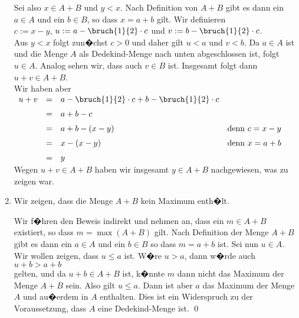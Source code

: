 \begin{enumerate}
      Sei also $x \in A + B$ und $y < x$.  Nach Definition von $A + B$ gibt es dann ein $a \in A$ und ein
      $b \in B$, so dass $x = a + b$ gilt.  Wir definieren
      \\[0.2cm]
      \hspace*{1.3cm} 
      $c := x - y$, \quad $u := a - \bruch{1}{2} \cdot c$ \quad und \quad
      $v := b - \bruch{1}{2} \cdot c$.
      \\[0.2cm]
      Aus $y < x $ folgt zun�chst $c > 0$ und daher gilt $u < a$ und $v < b$.  Da $a \in A$ ist und die
      Menge $A$ als Dedekind-Menge nach unten abgeschlossen ist, folgt $u \in A$.  Analog sehen wir, dass
      auch $v \in B$ ist.  Insgesamt folgt dann
      \\[0.2cm]
      \hspace*{1.3cm}
      $u + v \in A + B$.
      \\[0.2cm]
      Wir haben aber
      \\[0.2cm]
      \hspace*{1.3cm}
      $
      \begin{array}[t]{lcll}
        u + v & = & a - \bruch{1}{2} \cdot c + b - \bruch{1}{2} \cdot c \\[0.2cm]
              & = & a + b - c                                           \\[0.2cm]
              & = & a + b - (x - y)                                     
                  & \mbox{denn $c = x - y$}                             \\[0.2cm]
              & = & x - (x - y)                                     
                  & \mbox{denn $x = a + b$}                             \\[0.2cm]
              & = & y
      \end{array}
      $
      \\[0.2cm]
      Wegen $u + v \in A + B$ haben wir insgesamt $y \in A + B$ nachgewiesen, was zu zeigen war.
\item Wir zeigen, dass die Menge $A + B$ kein Maximum enth�lt.

      Wir f�hren den Beweis indirekt und nehmen an, dass ein $m \in A + B$ existiert, so dass
      $m = \max(A + B)$ gilt.  Nach Definition der Menge $A + B$ gibt es dann ein $a \in A$ und ein 
      $b \in B$ so dass $m = a + b$ ist.  Sei nun $u \in A$.  Wir wollen zeigen, dass $u \leq a$
      ist. W�re $u > a$, dann w�rde auch 
      \\[0.2cm]
      \hspace*{1.3cm}
      $u + b > a + b$
      \\[0.2cm]
      gelten, und da $u + b \in A + B$ ist, k�nnte $m$ dann nicht das Maximum der Menge $A + B$ sein.
      Also gilt $u \leq a$.  Dann ist aber $a$ das Maximum der Menge $A$ und au�erdem in $A$ enthalten.
      Dies ist ein Widerspruch zu der Voraussetzung, dass $A$ eine Dedekind-Menge ist. \qed
\end{enumerate}

